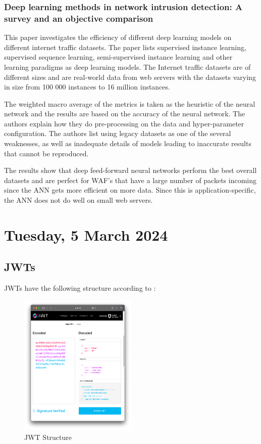 \subsubsection{Deep learning methods in network intrusion detection: A survey and an objective comparison \cite{GAMAGE2020102767}}
This paper investigates the efficiency of different deep learning models on different internet traffic datasets. The paper lists supervised instance learning, supervised sequence learning, semi-supervised instance learning and other learning paradigms as deep learning models. The Internet traffic datasets are of different sizes and are real-world data from web servers with the datasets varying in size from 100 000 instances to 16 million instances.

The weighted macro average of the metrics is taken as the heuristic of the neural network and the results are based on the accuracy of the neural network. The authors explain how they do pre-processing on the data and hyper-parameter configuration. The authors list using legacy datasets as one of the several weaknesses, as well as inadequate details of models leading to inaccurate results that cannot be reproduced.

The results show that deep feed-forward neural networks perform the best overall datasets and are perfect for WAF's that have a large number of packets incoming since the ANN gets more efficient on more data. Since this is application-specific, the ANN does not do well on small web servers.

\pendsign

\section[2024/03/05]{Tuesday, 5 March 2024}

\subsection{JWTs}

JWTs have the following structure according to \cite{JWTIO}:

\begin{figure}[H]
    \centering
    \includegraphics[width=0.5\textwidth]{2024/Images/Theoretical Background/debugger.png}
    \caption{JWT Structure}
    \label{fig:jwt_structure}
\end{figure}

